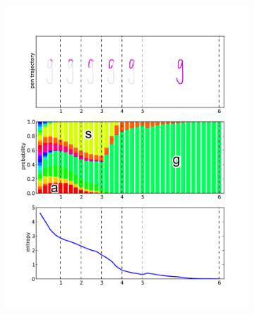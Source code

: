 \documentclass{sigchi}
\begin{document}
\begin{figure}
  \centering
  \begin{subfigure}[b]{0.25\textwidth}
    \includegraphics[width=\textwidth]{figures/entropy_g.pdf}
    \caption{}
    \label{fig:entropy_g}
  \end{subfigure}
  \begin{subfigure}[b]{0.25\textwidth}

\end{subfigure}
\end{figure}
\end{document}
